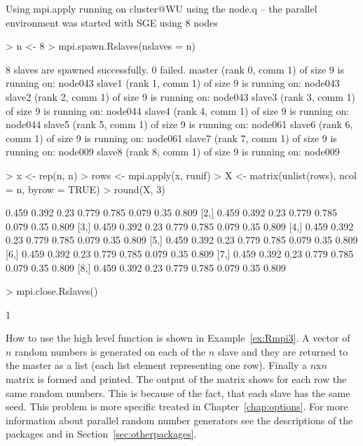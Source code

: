 \begin{Example} Using mpi.apply\newline
running on cluster@WU using the node.q -- the parallel environment was
started with SGE using 8 nodes

\begin{Schunk}
\begin{Sinput}
> n <- 8
> mpi.spawn.Rslaves(nslaves = n)
\end{Sinput}
\begin{Soutput}
	8 slaves are spawned successfully. 0 failed.
master (rank 0, comm 1) of size 9 is running on: node043 
slave1 (rank 1, comm 1) of size 9 is running on: node043 
slave2 (rank 2, comm 1) of size 9 is running on: node043 
slave3 (rank 3, comm 1) of size 9 is running on: node044 
slave4 (rank 4, comm 1) of size 9 is running on: node044 
slave5 (rank 5, comm 1) of size 9 is running on: node061 
slave6 (rank 6, comm 1) of size 9 is running on: node061 
slave7 (rank 7, comm 1) of size 9 is running on: node009 
slave8 (rank 8, comm 1) of size 9 is running on: node009 
\end{Soutput}
\begin{Sinput}
> x <- rep(n, n)
> rows <- mpi.apply(x, runif)
> X <- matrix(unlist(rows), ncol = n, byrow = TRUE)
> round(X, 3)
\end{Sinput}
\begin{Soutput}
      [,1]  [,2] [,3]  [,4]  [,5]  [,6] [,7]  [,8]
[1,] 0.459 0.392 0.23 0.779 0.785 0.079 0.35 0.809
[2,] 0.459 0.392 0.23 0.779 0.785 0.079 0.35 0.809
[3,] 0.459 0.392 0.23 0.779 0.785 0.079 0.35 0.809
[4,] 0.459 0.392 0.23 0.779 0.785 0.079 0.35 0.809
[5,] 0.459 0.392 0.23 0.779 0.785 0.079 0.35 0.809
[6,] 0.459 0.392 0.23 0.779 0.785 0.079 0.35 0.809
[7,] 0.459 0.392 0.23 0.779 0.785 0.079 0.35 0.809
[8,] 0.459 0.392 0.23 0.779 0.785 0.079 0.35 0.809
\end{Soutput}
\begin{Sinput}
> mpi.close.Rslaves()
\end{Sinput}
\begin{Soutput}
[1] 1
\end{Soutput}
\end{Schunk}
\label{ex:Rmpi3}
\end{Example}

How to use the high level function  is shown in
Example~\ref{ex:Rmpi3}. A vector of $n$ random numbers is generated on
each of the $n$ slave and they are returned to the master as a
list (each list element representing one row). Finally a $n$x$n$
matrix is formed and printed. The output of the matrix shows for each
row the same random numbers. This is because of the fact, that each
slave has the same seed. This problem is more specific treated in
Chapter~\ref{chap:options}. For more information about parallel random
number generators see the descriptions of the packages 
and  in Section~\ref{sec:otherpackages}.

